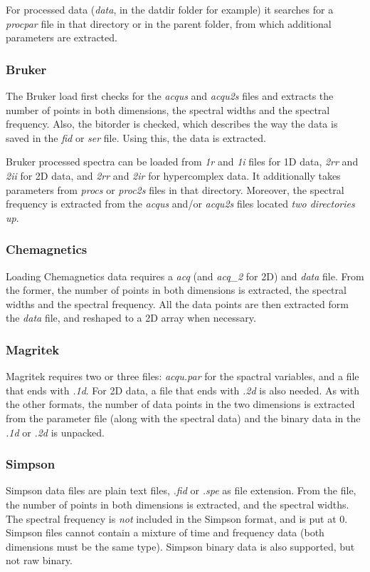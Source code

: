 \documentclass[11pt,a4paper]{article}
\begin{document}
For processed data (\textit{data}, in the datdir folder for example) it searches for a \textit{procpar} file in that directory or in the parent folder, from which additional parameters are extracted.

\subsubsection*{Bruker}
The Bruker load first checks for the \textit{acqus} and \textit{acqu2s} files and extracts the number of points in both dimensions, the spectral widths and the spectral frequency. Also, the bitorder is checked, which describes the way the data is saved in the \textit{fid} or \textit{ser} file. Using this, the data is extracted.

Bruker processed spectra can be loaded from \textit{1r} and \textit{1i} files for 1D data, \textit{2rr} and \textit{2ii} for 2D data, and \textit{2rr} and \textit{2ir} for hypercomplex data. It additionally takes parameters from \textit{procs} or \textit{proc2s} files in that directory. Moreover, the spectral frequency is extracted from the \textit{acqus} and/or \textit{acqu2s} files located \textit{two directories up}.

 
\subsubsection*{Chemagnetics}
Loading Chemagnetics data requires a \textit{acq} (and \textit{acq\_2} for 2D) and \textit{data} file. From the former, the number of points in both dimensions is extracted, the spectral widths and the spectral frequency. All the data points are then extracted form the \textit{data} file, and reshaped to a 2D array when necessary.

\subsubsection*{Magritek}
Magritek requires two or three files: \textit{acqu.par} for the spactral variables, and a file that ends with \textit{.1d}. For 2D data, a file that ends with \textit{.2d} is also needed. As with the other formats, the number of data points in the two dimensions is extracted from the parameter file (along with the spectral data) and the binary data in the \textit{.1d} or \textit{.2d} is unpacked.

\subsubsection*{Simpson}
Simpson data files are plain text files, \textit{.fid} or \textit{.spe} as file extension. From the file, the number of points in both dimensions is extracted, and the spectral widths. The spectral frequency is \textit{not} included in the Simpson format, and is put at 0. Simpson files cannot contain a mixture of time and frequency data (both dimensions must be the same type). Simpson binary data is also supported, but not raw binary.
\end{document}

